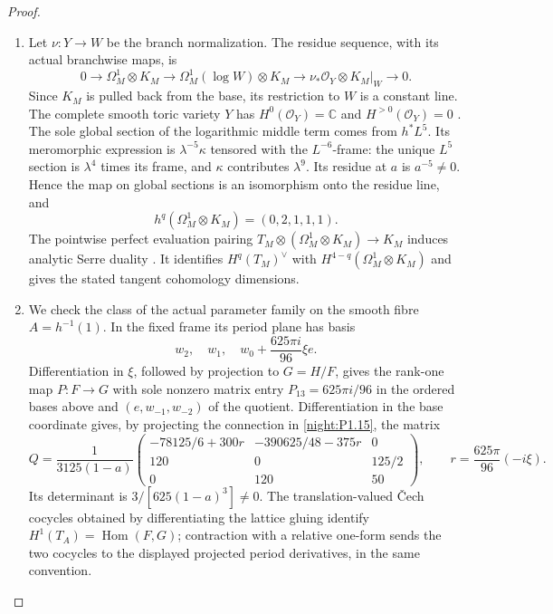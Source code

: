 \begin{proof}
\begin{enumerate}[label=\arabic*.]
\item Let $\nu:Y\to W$ be the branch normalization.  The residue
sequence, with its actual branchwise maps, is
\[
0\longrightarrow\Omega^1_M\otimes K_M
\longrightarrow\Omega^1_M(\log W)\otimes K_M
\longrightarrow\nu_*\mathcal O_Y\otimes K_M|_W
\longrightarrow0.
\]
Since $K_M$ is pulled back from the base, its restriction to $W$ is
a constant line.  The complete smooth toric variety $Y$ has
$H^0(\mathcal O_Y)=\mathbb C$ and $H^{>0}(\mathcal O_Y)=0$
\cite[Theorem~9.2.3, p.~410, with divisor zero]{CoxLittleSchenck2011}.
The sole global section of the logarithmic middle term comes from
$h^*L^5$.  Its meromorphic expression is
$\lambda^{-5}\kappa$ tensored with the $L^{-6}$-frame: the
unique $L^5$ section is $\lambda^4$ times its frame, and
$\kappa$ contributes $\lambda^9$.  Its residue at $a$ is
$a^{-5}\ne0$.  Hence the map on global sections is an isomorphism
onto the residue line, and
\[
h^q(\Omega^1_M\otimes K_M)=(0,2,1,1,1).
\]
The pointwise perfect evaluation pairing
$T_M\otimes(\Omega^1_M\otimes K_M)\to K_M$ induces analytic
Serre duality
\cite[\S13, Theorem~4, p.~22; \S15, p.~23]{Serre1955Duality}.
It identifies $H^q(T_M)^\vee$ with
$H^{4-q}(\Omega^1_M\otimes K_M)$ and gives the stated tangent
cohomology dimensions.

\item We check the class of the actual parameter family on the
smooth fibre $A=h^{-1}(1)$.  In the fixed frame its period plane
has basis
\[
w_2,\quad w_1,\quad w_0+\frac{625\pi i}{96}\xi e.
\]
Differentiation in $\xi$, followed by projection to $G=H/F$,
gives the rank-one map $P:F\to G$ with sole nonzero matrix entry
$P_{13}=625\pi i/96$ in the ordered bases above and
$(e,w_{-1},w_{-2})$ of the quotient.
Differentiation in the base coordinate gives, by projecting the
connection in \cref{night:P1.15}, the matrix
\[
Q=\frac1{3125(1-a)}
\begin{pmatrix}
-78125/6+300r&-390625/48-375r&0\\
120&0&125/2\\
0&120&50
\end{pmatrix},
\qquad r=\frac{625\pi}{96}(-i\xi).
\]
Its determinant is $3/[625(1-a)^3]\ne0$.
The translation-valued \v Cech cocycles obtained by differentiating
the lattice gluing identify
$H^1(T_A)=\operatorname{Hom}(F,G)$; contraction with a relative
one-form sends the two cocycles to the displayed projected period
derivatives, in the same convention.


\end{enumerate}
\end{proof}
